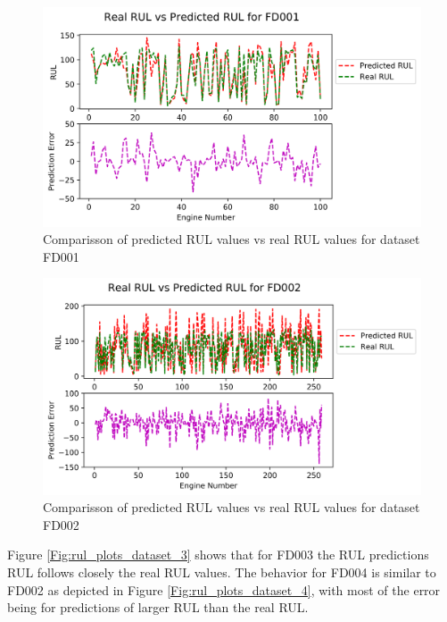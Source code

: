 \documentclass[preprint,12pt]{elsarticle}%
\begin{document}
\begin{figure}[!h]
\begin{center}
\includegraphics[scale=0.70]{Figures/rul_plots_dataset_1.png}
\caption{Comparisson of predicted RUL values vs real RUL values for dataset FD001}
\label{Fig:rul_plots_dataset_1}
\end{center}
\end{figure}

\begin{figure}[!h]
\begin{center}
\includegraphics[scale=0.70]{Figures/rul_plots_dataset_2.png}
\caption{Comparisson of predicted RUL values vs real RUL values for dataset FD002}
\label{Fig:rul_plots_dataset_2}
\end{center}
\end{figure}

\pagebreak

Figure \ref{Fig:rul_plots_dataset_3} shows that for FD003 the RUL predictions RUL follows closely the real RUL values. The behavior for FD004 is similar to FD002 as depicted in Figure \ref{Fig:rul_plots_dataset_4}, with most of the error being for predictions of larger RUL than the real RUL.
\end{document}

